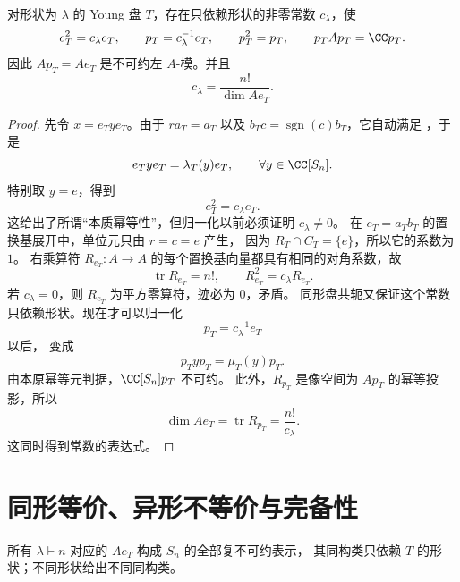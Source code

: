 \begin{theorem}
对形状为 $\lambda$ 的 Young 盘 $T$，存在只依赖形状的非零常数 $c_\lambda$，使
\[
e_T^2=c_\lambda e_T,\qquad
p_T=c_\lambda^{-1}e_T,\qquad
p_T^2=p_T,\qquad p_TAp_T=\CC p_T.
\]
因此 $Ap_T=Ae_T$ 是不可约左 $A$-模。并且
\[
c_\lambda=\frac{n!}{\dim Ae_T}.
\]
\end{theorem}

\begin{proof}
先令 $x=e_Tye_T$。由于 $r a_T=a_T$ 以及 $b_Tc=\operatorname{sgn}(c)b_T$，它自动满足 ，于是
\begin{equation}
e_Tye_T=\lambda_T(y)e_T,
\qquad \forall y\in\CC[S_n].
\label{eq:ete-scalar}
\end{equation}
特别取 $y=e$，得到
\[
e_T^2=c_\lambda e_T.
\]
这给出了所谓“本质幂等性”，但归一化以前必须证明 $c_\lambda\ne0$。
在 $e_T=a_Tb_T$ 的置换基展开中，单位元只由 $r=c=e$ 产生，
因为 $R_T\cap C_T=\{e\}$，所以它的系数为 $1$。
右乘算符 $R_{e_T}:A\to A$ 的每个置换基向量都具有相同的对角系数，故
\[
\operatorname{tr}R_{e_T}=n!,\qquad R_{e_T}^2=c_\lambda R_{e_T}.
\]
若 $c_\lambda=0$，则 $R_{e_T}$ 为平方零算符，迹必为 $0$，矛盾。
同形盘共轭又保证这个常数只依赖形状。现在才可以归一化
\[
p_T=c_\lambda^{-1}e_T
\]
以后， 变成
\[
p_Typ_T=\mu_T(y)p_T.
\]
由本原幂等元判据，$\CC[S_n]p_T$ 不可约。
此外，$R_{p_T}$ 是像空间为 $Ap_T$ 的幂等投影，所以
\[
\dim Ae_T=\operatorname{tr}R_{p_T}=\frac{n!}{c_\lambda}.
\]
这同时得到常数的表达式。
\end{proof}

\section{同形等价、异形不等价与完备性}

\begin{theorem}
所有 $\lambda\vdash n$ 对应的 $Ae_T$ 构成 $S_n$ 的全部复不可约表示，
其同构类只依赖 $T$ 的形状；不同形状给出不同同构类。
\end{theorem}

